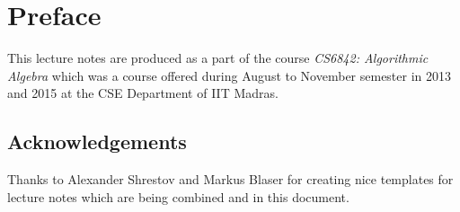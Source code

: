 \chapter*{Preface}

This lecture notes are produced as a part of the course \textit{CS6842: Algorithmic Algebra} which was a course offered during August to November semester in 2013 and 2015 at the CSE Department of IIT Madras.

\section*{Acknowledgements}
Thanks to Alexander Shrestov and Markus Blaser for creating nice templates for lecture notes which are being combined and in this document.
